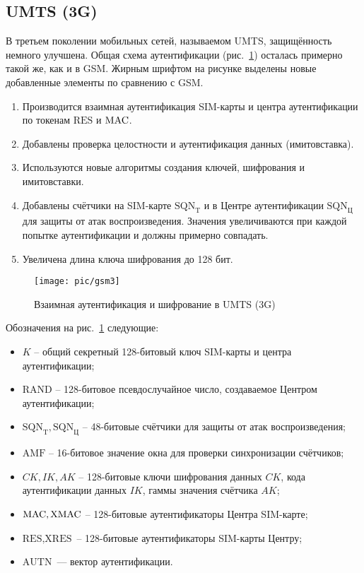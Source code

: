 \subsection{UMTS (3G)}

В третьем поколении мобильных сетей, называемом UMTS, защищённость немного улучшена. Общая схема аутентификации (рис.~\ref{fig:gsm3}) осталась примерно такой же, как и в GSM. Жирным шрифтом на рисунке выделены новые добавленные элементы по сравнению с GSM.
\begin{enumerate}
    \item Производится взаимная аутентификация SIM-карты и центра аутентификации по токенам $\textrm{RES}$ и $\textrm{MAC}$.
    \item Добавлены проверка целостности и аутентификация данных (имитовставка).
    \item Используются новые алгоритмы создания ключей, шифрования и имитовставки.
    \item Добавлены счётчики на SIM-карте $\textrm{SQN}_\textrm{T}$ и в Центре аутентификации $\textrm{SQN}_\textrm{Ц}$ для защиты от атак воспроизведения. Значения увеличиваются при каждой попытке аутентификации и должны примерно совпадать.
    \item Увеличена длина ключа шифрования до 128 бит.
\end{enumerate}

\begin{figure}[!ht]
	\centering
	\texttt{[image: pic/gsm3]}
	\caption{Взаимная аутентификация и шифрование в UMTS (3G)\label{fig:gsm3}}
\end{figure}

Обозначения на рис.~\ref{fig:gsm3} следующие:
\begin{itemize}
    \item $K$ -- общий секретный 128-битовый ключ SIM-карты и центра аутентификации;
    \item $\textrm{RAND}$ -- 128-битовое псевдослучайное число, создаваемое Центром аутентификации;
    \item $\textrm{SQN}_\textrm{T}, \textrm{SQN}_\textrm{Ц}$ -- 48-битовые счётчики для защиты от атак воспроизведения;
    \item $\textrm{AMF}$ -- 16-битовое значение окна для проверки синхронизации счётчиков;
    \item $CK, IK, AK$ -- 128-битовые ключи шифрования данных $CK$, кода аутентификации данных $IK$, гаммы значения счётчика $AK$;
    \item $\textrm{MAC}, \textrm{XMAC}$ -- 128-битовые аутентификаторы Центра SIM-карте;
    \item $\textrm{RES}, \textrm{XRES}$ -- 128-битовые аутентификаторы SIM-карты Центру;
    \item $\textrm{AUTN}$~--- вектор аутентификации.
\end{itemize}

